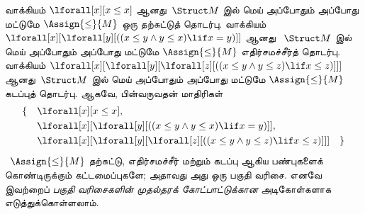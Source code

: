 \documentclass[../../../include/open-logic-section]{subfiles}
\begin{document}
\begin{ex}
வாக்கியம் $\lforall[x][x \le x]$ ஆனது~$\Struct M$ இல் மெய் அப்போதும் அப்போது மட்டுமே
$\Assign{\le}{M}$ ஒரு தற்சுட்டுத் தொடர்பு. வாக்கியம்
$\lforall[x][\lforall[y][((x \le y \land y \le x) \lif x = y)]]$ ஆனது
~$\Struct M$ இல் மெய் அப்போதும் அப்போது மட்டுமே $\Assign{\le}{M}$ எதிர்சமச்சீர்த் தொடர்பு.
வாக்கியம் $\lforall[x][\lforall[y][\lforall[z][((x \le y \land y \le z)
      \lif x \le z)]]]$ ஆனது~$\Struct M$ இல் மெய் அப்போதும் அப்போது மட்டுமே $\Assign{\le}{M}$
கடப்புத் தொடர்பு. ஆகவே, பின்வருவதன் மாதிரிகள்
\begin{align*}
\{\quad &\lforall[x][x \le x], \\
   & \lforall[x][\lforall[y][((x \le y \land y \le
    x) \lif x = y)]], \\
   &\lforall[x][\lforall[y][\lforall[z][((x \le y
      \land y \le z) \lif x \le z)]]] \quad \}
\end{align*}
~$\Assign{\le}{M}$ தற்சுட்டு, எதிர்சமச்சீர் மற்றும் கடப்பு ஆகிய
பண்புகளைக் கொண்டிருக்கும் கட்டமைப்புகளே; அதாவது அது ஒரு பகுதி வரிசை.
எனவே இவற்றைப் \emph{பகுதி வரிசைகளின் முதல்தரக் கோட்பாட்டுக்கான}
அடிகோள்களாக எடுத்துக்கொள்ளலாம்.
\end{ex}
\end{document}
